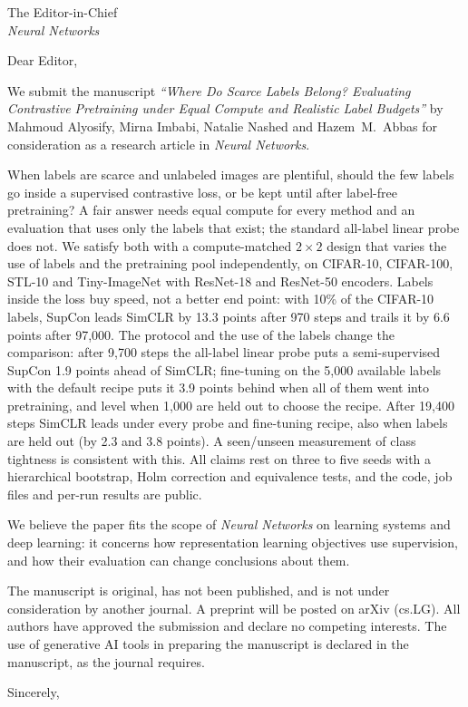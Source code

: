 \documentclass[11pt]{letter}
\date{\today}
\begin{document}
\begin{letter}{The Editor-in-Chief\\\emph{Neural Networks}}
\opening{Dear Editor,}

We submit the manuscript \emph{``Where Do Scarce Labels Belong? Evaluating Contrastive Pretraining under Equal
Compute and Realistic Label Budgets''} by Mahmoud Alyosify, Mirna Imbabi, Natalie Nashed and Hazem~M.~Abbas for consideration as a
research article in \emph{Neural Networks}.

When labels are scarce and unlabeled images are plentiful, should the few labels go inside a supervised
contrastive loss, or be kept until after label-free pretraining? A fair answer needs equal compute for every
method and an evaluation that uses only the labels that exist; the standard all-label linear probe does not. We
satisfy both with a compute-matched $2\times2$ design that varies the use of labels and the pretraining pool independently, on
CIFAR-10, CIFAR-100, STL-10 and Tiny-ImageNet with ResNet-18 and ResNet-50 encoders. Labels inside the loss buy
speed, not a better end point: with 10\% of the CIFAR-10 labels, SupCon leads SimCLR by 13.3 points after 970
steps and trails it by 6.6 points after 97,000. The protocol and the use of the labels change the
comparison: after 9,700 steps the all-label linear probe puts a semi-supervised SupCon 1.9 points ahead of SimCLR;
fine-tuning on the 5,000 available labels with the default recipe puts it 3.9 points behind when all of them went into pretraining, and
level when 1,000 are held out to choose the recipe. After 19,400 steps SimCLR leads under every probe and
fine-tuning recipe, also when labels are held out (by 2.3 and 3.8 points). A seen/unseen measurement of
class tightness is consistent with this. All claims rest on three to five seeds with a
hierarchical bootstrap, Holm correction and equivalence tests, and the code, job files and per-run results
are public.

We believe the paper fits the scope of \emph{Neural Networks} on learning systems and deep learning: it
concerns how representation learning objectives use supervision, and how their evaluation can change
conclusions about them.

The manuscript is original, has not been published, and is not under consideration by another journal. A
preprint will be posted on arXiv (cs.LG). All authors have approved the submission and declare no competing
interests. The use of generative AI tools in preparing the manuscript is declared in the manuscript, as the
journal requires.

\closing{Sincerely,}
\end{letter}
\end{document}
